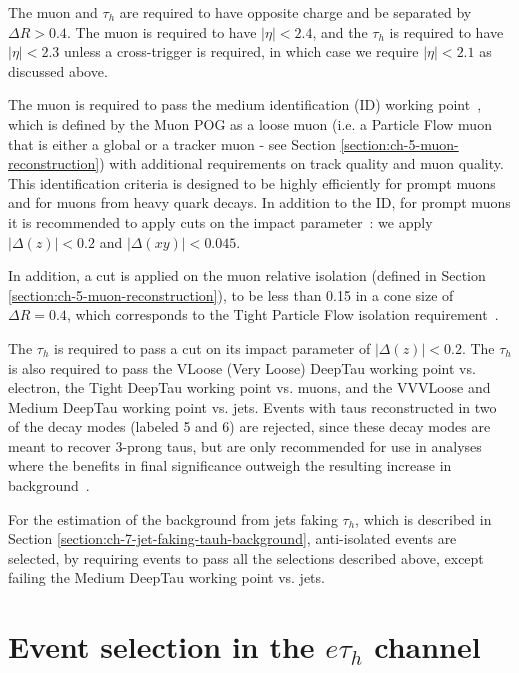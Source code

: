 The muon and $\tau_h$ are required to have opposite charge and be separated by $\Delta R > 0.4$. The muon is required to have $|\eta| < 2.4$, and the $\tau_{h}$ is required to have $|\eta| < 2.3$ unless a cross-trigger is required, in which case we require $|\eta| < 2.1$ as discussed above.

The muon is required to pass the medium identification (ID) working point~\cite{twiki_MUON_POG_Run2_guide}, which is defined by the Muon POG as a loose muon (i.e. a Particle Flow muon that is either a global or a tracker muon - see Section \ref{section:ch-5-muon-reconstruction}) with additional requirements on track quality and muon quality. This identification criteria is designed to be highly efficiently for prompt muons and for muons from heavy quark decays. In addition to the ID, for prompt muons it is recommended to apply cuts on the impact parameter~\cite{twiki_MUON_POG_Run2_guide}: we apply $|\Delta(z)| < 0.2$ and $|\Delta(xy)| < 0.045$. 

In addition, a cut is applied on the muon relative isolation (defined in Section \ref{section:ch-5-muon-reconstruction}), to be less than 0.15 in a cone size of $\Delta R = 0.4$, which corresponds to the Tight Particle Flow isolation requirement~\cite{twiki_MUON_POG_Run2_guide}.

The $\tau_h$ is required to pass a cut on its impact parameter of $|\Delta(z)| < 0.2$. The $\tau_h$ is also required to pass the VLoose (Very Loose) DeepTau working point vs. electron, the Tight DeepTau working point vs. muons, and the VVVLoose and Medium DeepTau working point vs. jets. Events with taus reconstructed in two of the decay modes (labeled 5 and 6) are rejected, since these decay modes are meant to recover 3-prong taus, but are only recommended for use in analyses where the benefits in final significance outweigh the resulting increase in background~\cite{twiki_TAU_POG_tauidrecommendationforrun2}.

For the estimation of the background from jets faking $\tau_{h}$, which is described in Section \ref{section:ch-7-jet-faking-tauh-background}, anti-isolated events are selected, by requiring events to pass all the selections described above, except failing the Medium DeepTau working point vs. jets.

\section{Event selection in the \texorpdfstring{$e\tau_{h}$}{etauh} channel}
\label{section:ch-6-event-selection-etau}

